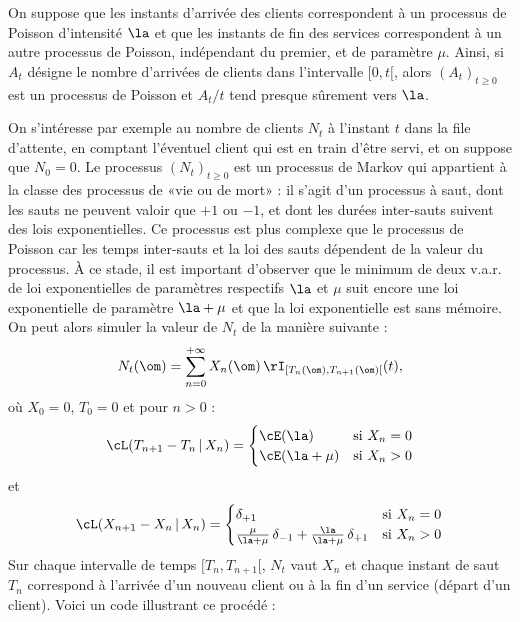 On suppose que les instants d'arrivée des clients correspondent à un processus
de Poisson d'intensité $\la$ et que les instants de fin des services
correspondent à un autre processus de Poisson, indépendant du premier, et de
paramètre $\mu$.  Ainsi, si $A_t$ désigne le nombre d'arrivées de clients dans
l'intervalle $[0,t[$, alors $(A_t)_{t\geq 0}$ est un processus de Poisson et
$A_t/t$ tend presque sûrement vers $\la$.

On s'intéresse par exemple au nombre de clients $N_t$ à l'instant $t$ dans la
file d'attente, en comptant l'éventuel client qui est en train d'être servi,
et on suppose que $N_0=0$. Le processus $(N_t)_{t\geq0}$ est un processus de
Markov qui appartient à la classe des processus de «vie ou de mort» : il
s'agit d'un processus à saut, dont les sauts ne peuvent valoir que $+1$ ou
$-1$, et dont les durées inter-sauts suivent des lois exponentielles. Ce
processus est plus complexe que le processus de Poisson car les temps
inter-sauts et la loi des sauts dépendent de la valeur du processus. À ce
stade, il est important d'observer que le minimum de deux v.a.r. de loi
exponentielles de paramètres respectifs $\la$ et $\mu$ suit encore une loi
exponentielle de paramètre $\la+\mu$ et que la loi exponentielle est sans
mémoire.  On peut alors simuler la valeur de $N_t$ de la manière suivante :
$$
N_t(\om)=\sum_{n=0}^{+\infty} X_n(\om)
\,\rI_{[T_n(\om),T_{n+1}(\om)[}(t),
$$
où $X_0=0$, $T_0=0$ et pour $n>0$ :
$$
\cL(T_{n+1}-T_{n}\,\vert\,X_n)=
\begin{cases}
\cE(\la) & \text{si $X_n=0$} \\
\cE(\la+\mu) & \text{si $X_n>0$}
\end{cases}
$$
et 
$$
\cL(X_{n+1}-X_n\,\vert\,X_n)=
\begin{cases}
\delta_{+1} & \text{si $X_n=0$} \\
\frac{\mu}{\la+\mu}\,\delta_{-1}+\frac{\la}{\la+\mu}\,\delta_{+1} & \text{si $X_n>0$}
\end{cases}
$$
Sur chaque intervalle de temps $[T_n,T_{n+1}[$, $N_t$ vaut $X_n$ et chaque
instant de saut $T_n$ correspond à l'arrivée d'un nouveau client ou à la fin
d'un service (départ d'un client). Voici un code \ML{} illustrant ce procédé :


